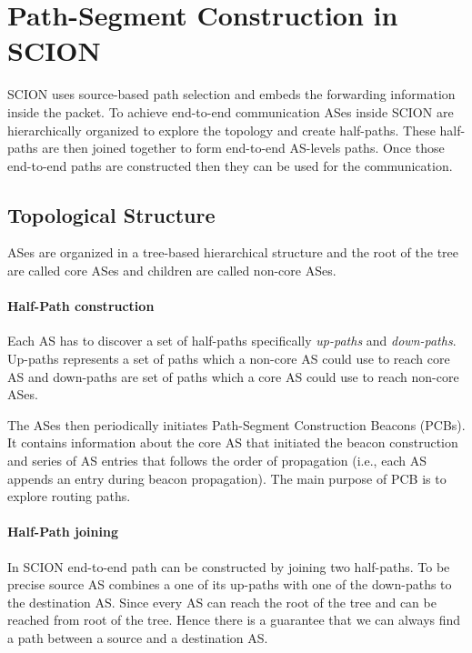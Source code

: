 \section{Path-Segment Construction in SCION} \label{path_res}
SCION \cite{PeSzReCh2017, scionfwd} uses source-based path selection and embeds the forwarding information inside the packet. To achieve end-to-end communication ASes inside SCION are hierarchically organized to explore the topology and create half-paths. These half-paths are then joined together to form end-to-end AS-levels paths. Once those end-to-end paths are constructed then they can be used for the communication.

\subsection{Topological Structure}
ASes are organized in a tree-based hierarchical structure and the root of the tree are called core ASes and children are called non-core ASes.
\paragraph{Half-Path construction} Each AS has to discover a set of half-paths specifically \textit{up-paths} and \textit{down-paths}. Up-paths represents a set of paths which a non-core AS could use to reach core AS and down-paths are set of paths which a core AS could use to reach non-core ASes.

The ASes then periodically initiates Path-Segment Construction Beacons (PCBs). It contains information about the core AS that initiated the beacon construction and series of AS entries that follows the order of propagation (i.e., each AS appends an entry during beacon propagation). The main purpose of PCB is to explore routing paths. 

\paragraph{Half-Path joining} In SCION end-to-end path can be constructed by joining two half-paths. To be precise source AS combines a one of its up-paths with one of the down-paths to the destination AS. Since every AS can reach the root of the tree and can be reached from root of the tree. Hence there is a guarantee that we can always find a path between a source and a destination AS.

